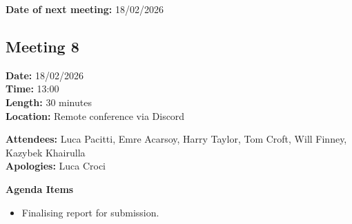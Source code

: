 \documentclass[11pt]{article}
\begin{document}
    \textbf{Date of next meeting:} 18/02/2026



    \vspace{1.5\baselineskip}
    \subsection{Meeting 8}

    \textbf{Date:} 18/02/2026 \\
    \textbf{Time:} 13:00 \\
    \textbf{Length:} 30 minutes \\
    \textbf{Location:} Remote conference via Discord

    \textbf{Attendees:} Luca Pacitti, Emre Acarsoy, Harry Taylor, Tom Croft, Will Finney, Kazybek Khairulla \\
    \textbf{Apologies:} Luca Croci

    \textbf{Agenda Items}
    \begin{itemize}
        \item Finalising report for submission.
    \end{itemize}
\end{document}
